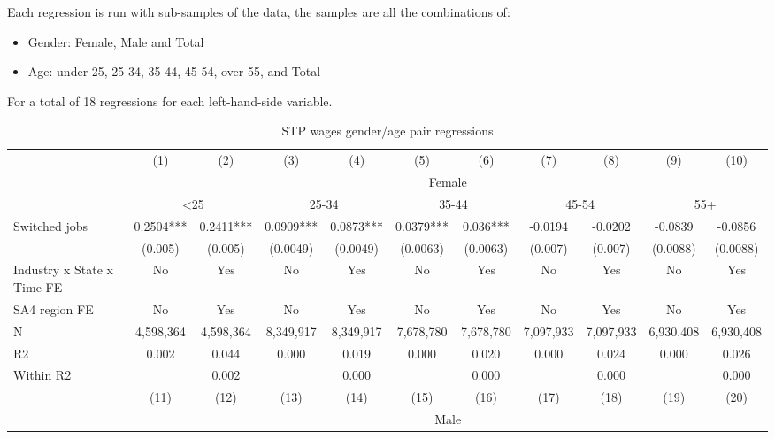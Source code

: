 \documentclass[11pt,twocolumn,openany,leqno]{e61-research-note}
\begin{document}
\begin{appendix}
Each regression is run with sub-samples of the data, the samples are all the combinations of:
\begin{itemize}
    \item Gender: Female, Male and Total
    \item Age: under 25, 25-34, 35-44, 45-54, over 55, and Total
\end{itemize}

For a total of 18 regressions for each left-hand-side variable.

{\renewcommand{\arraystretch}{1.1}
\tabcolsep
\begin{table*}[p]
  \centering
  \caption{STP wages gender/age pair regressions}
    \begin{tabular}{lcccccccccc}
    \toprule
          & (1)   & (2)   & (3)   & (4)   & (5)   & (6)   & (7)   & (8)   & (9)   & (10) \\
\cmidrule{2-11}          & \multicolumn{10}{c}{Female} \\
\cmidrule(lr){2-3} \cmidrule(lr){4-5} \cmidrule(lr){6-7} \cmidrule(lr){8-9} \cmidrule(lr){10-11}          & \multicolumn{2}{c}{<25} & \multicolumn{2}{c}{25-34} & \multicolumn{2}{c}{35-44} & \multicolumn{2}{c}{45-54} & \multicolumn{2}{c}{55+} \\
    \midrule
    Switched jobs & 0.2504*** & 0.2411*** & 0.0909*** & 0.0873*** & 0.0379*** & 0.036*** & -0.0194 & -0.0202 & -0.0839 & -0.0856 \\
          & (0.005) & (0.005) & (0.0049) & (0.0049) & (0.0063) & (0.0063) & (0.007) & (0.007) & (0.0088) & (0.0088) \\
    \midrule
    Industry x State x Time FE & No    & Yes   & No    & Yes   & No    & Yes   & No    & Yes   & No    & Yes \\
    SA4 region FE & No    & Yes   & No    & Yes   & No    & Yes   & No    & Yes   & No    & Yes \\
    \midrule
    N     & 4,598,364 & 4,598,364 & 8,349,917 & 8,349,917 & 7,678,780 & 7,678,780 & 7,097,933 & 7,097,933 & 6,930,408 & 6,930,408 \\
    R2    & 0.002 & 0.044 & 0.000 & 0.019 & 0.000 & 0.020 & 0.000 & 0.024 & 0.000 & 0.026 \\
    Within R2 &       & 0.002 &       & 0.000 &       & 0.000 &       & 0.000 &       & 0.000 \\
    \midrule
          & (11)  & (12)  & (13)  & (14)  & (15)  & (16)  & (17)  & (18)  & (19)  & (20) \\
\cmidrule{2-11}          & \multicolumn{10}{c}{Male} \\

\end{tabular}
\end{table*}}
\end{appendix}
\end{document}
